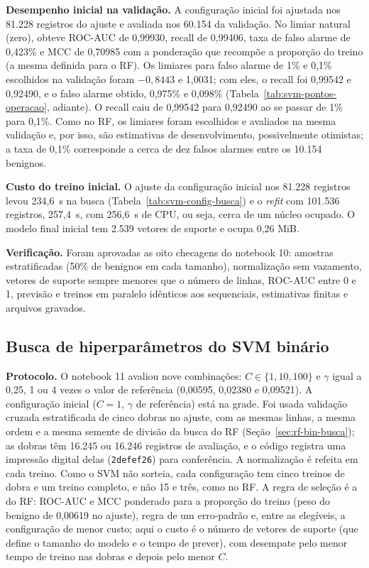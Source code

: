 \documentclass[
    12pt,                %
    openright,           %
    oneside,             %
    a4paper,             %
    english,             %
    brazil               %
]{abntex2}
\begin{document}
\textbf{Desempenho inicial na validação.} A configuração inicial foi ajustada nos 81.228 registros do ajuste e avaliada nos 60.154 da validação. No limiar natural (zero), obteve ROC-AUC de 0,99930, recall de 0,99406, taxa de falso alarme de 0,423\% e MCC de 0,70985 com a ponderação que recompõe a proporção do treino (a mesma definida para o RF). Os limiares para falso alarme de 1\% e 0,1\% escolhidos na validação foram $-0{,}8443$ e 1,0031; com eles, o recall foi 0,99542 e 0,92490, e o falso alarme obtido, 0,975\% e 0,098\% (Tabela~\ref{tab:svm-pontos-operacao}, adiante). O recall caiu de 0,99542 para 0,92490 ao se passar de 1\% para 0,1\%. Como no RF, os limiares foram escolhidos e avaliados na mesma validação e, por isso, são estimativas de desenvolvimento, possivelmente otimistas; a taxa de 0,1\% corresponde a cerca de dez falsos alarmes entre os 10.154 benignos.

\textbf{Custo do treino inicial.} O ajuste da configuração inicial nos 81.228 registros levou 234,6~s na busca (Tabela~\ref{tab:svm-config-busca}) e o \textit{refit} com 101.536 registros, 257,4~s, com 256,6~s de CPU, ou seja, cerca de um núcleo ocupado. O modelo final inicial tem 2.539 vetores de suporte e ocupa 0,26 MiB.

\textbf{Verificação.} Foram aprovadas as oito checagens do notebook 10: amostras estratificadas (50\% de benignos em cada tamanho), normalização sem vazamento, vetores de suporte sempre menores que o número de linhas, ROC-AUC entre 0 e 1, previsão e treinos em paralelo idênticos aos sequenciais, estimativas finitas e arquivos gravados.


\subsection{Busca de hiperparâmetros do SVM binário}
\label{sec:svm-bin-busca}

\textbf{Protocolo.} O notebook 11 avaliou nove combinações: $C \in \{1, 10, 100\}$ e $\gamma$ igual a 0,25, 1 ou 4 vezes o valor de referência (0,00595, 0,02380 e 0,09521). A configuração inicial ($C = 1$, $\gamma$ de referência) está na grade. Foi usada validação cruzada estratificada de cinco dobras no ajuste, com as mesmas linhas, a mesma ordem e a mesma semente de divisão da busca do RF (Seção~\ref{sec:rf-bin-busca}); as dobras têm 16.245 ou 16.246 registros de avaliação, e o código registra uma impressão digital delas (\texttt{2defef26}) para conferência. A normalização é refeita em cada treino. Como o SVM não sorteia, cada configuração tem cinco treinos de dobra e um treino completo, e não 15 e três, como no RF. A regra de seleção é a do RF: ROC-AUC e MCC ponderado para a proporção do treino (peso do benigno de 0,00619 no ajuste), regra de um erro-padrão e, entre as elegíveis, a configuração de menor custo; aqui o custo é o número de vetores de suporte (que define o tamanho do modelo e o tempo de prever), com desempate pelo menor tempo de treino nas dobras e depois pelo menor $C$.
\end{document}
